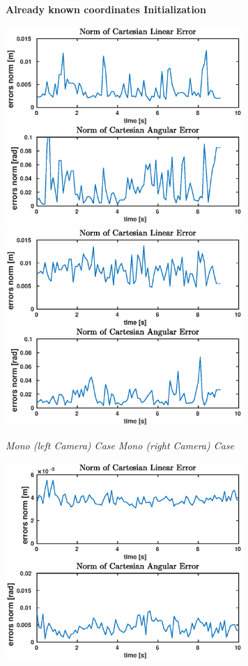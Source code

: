 \begin{figure}
	\centering
	\textbf{Already known coordinates Initialization}\\
	\vspace*{20px}
	\centerline{
		\includegraphics[width=9cm]{tracking/click-mono-left.eps}
		\includegraphics[width=9cm]{tracking/click-mono-right.eps}
	}
	\hspace*{15px}\textit{Mono (left Camera) Case} \hspace{125px} \textit{Mono (right Camera) Case}\\
	\vspace{30px}
	\centerline{
		\includegraphics[width=9cm]{tracking/click-stereo.eps}
}
\end{figure}
